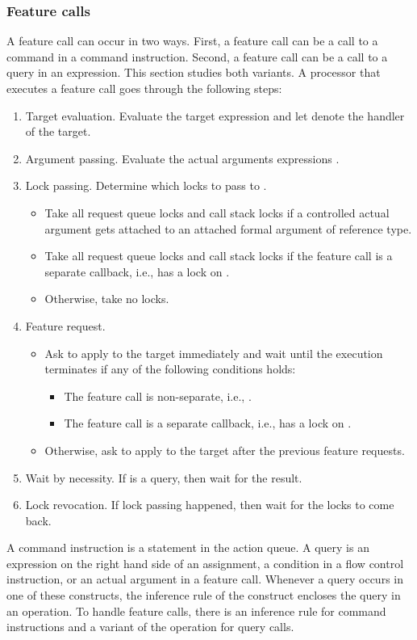 \subsubsection{Feature calls}\label{sec:feature calls}
A feature call can occur in two ways. First, a feature call can be a call to a command in a command instruction. Second, a feature call can be a call to a query in an expression. This section studies both variants. A processor  that executes a feature call  goes through the following steps:
\begin{enumerate}
	\item Target evaluation. Evaluate the target expression  and let  denote the handler of the target.
	\item Argument passing. Evaluate the actual arguments expressions .
	\item Lock passing. Determine which locks to pass to .
		\begin{itemize}
			\item Take all request queue locks and call stack locks if a controlled actual argument gets attached to an attached formal argument of reference type.
			\item Take all request queue locks and call stack locks if the feature call is a separate callback, i.e.,  has a lock on .
			\item Otherwise, take no locks.
		\end{itemize}
	\item Feature request.
		\begin{itemize}
			\item Ask  to apply  to the target immediately and wait until the execution terminates if any of the following conditions holds:
				\begin{itemize}
					\item The feature call is non-separate, i.e., .
					\item The feature call is a separate callback, i.e.,  has a lock on .
				\end{itemize}
			\item Otherwise, ask  to apply  to the target after the previous feature requests.
		\end{itemize}
	\item Wait by necessity. If  is a query, then wait for the result.
	\item Lock revocation. If lock passing happened, then wait for the locks to come back.
\end{enumerate}
A command instruction is a statement in the action queue. A query is an expression on the right hand side of an assignment, a condition in a flow control instruction, or an actual argument in a feature call. Whenever a query occurs in one of these constructs, the inference rule of the construct encloses the query in an  operation. To handle feature calls, there is an inference rule for command instructions and a variant of the  operation for query calls.

